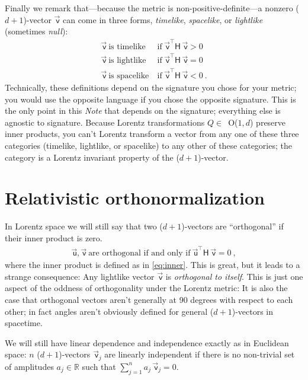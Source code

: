 \documentclass{article}
\newcommand{\metric}{\mathsf{H}}
\newcommand\upvec[1]{\!\vec{\,\mathrm{#1}}}
\newcommand{\Lvec}[1]{\upvec{\mathsf{#1}}} %
\newcommand{\plus}{\!+\!} %
\newcommand{\documentname}{\textsl{Note}}
\begin{document}
Finally we remark that---because the metric is non-positive-definite---a nonzero ($d\plus1$)-vector $\Lvec{v}$ can come in three forms, \emph{timelike}, \emph{spacelike}, or \emph{lightlike} (sometimes \emph{null}):
\begin{align}
    \Lvec{v} ~ \mbox{is timelike}  &~ \mbox{if} ~ \Lvec{v}^\top\metric\,\Lvec{v} > 0 \label{eq:timelike}\\
    \Lvec{v} ~ \mbox{is lightlike} &~ \mbox{if} ~ \Lvec{v}^\top\metric\,\Lvec{v} = 0 \label{eq:lightlike}\\
    \Lvec{v} ~ \mbox{is spacelike} &~ \mbox{if} ~ \Lvec{v}^\top\metric\,\Lvec{v} < 0 ~.\label{eq:spacelike}
\end{align}
Technically, these definitions depend on the signature you chose for your metric; you would use the opposite language if you chose the opposite signature.
This is the only point in this \documentname{} that depends on the signature; everything else is agnostic to signature.
Because Lorentz transformations $Q\in$~O($1,d$) preserve inner products, you can't Lorentz transform a vector from any one of these three categories (timelike, lightlike, or spacelike) to any other of these categories; the category is a Lorentz invariant property of the ($d\plus1$)-vector.

\section{Relativistic orthonormalization}\label{sec:orth}

In Lorentz space we will still say that two ($d\plus1$)-vectors are ``orthogonal'' if their inner product is zero.
\begin{align}
    \Lvec{u},\Lvec{v} ~ \mbox{are orthogonal if and only if} ~ \Lvec{u}^\top\metric\,\Lvec{v}=0 ~,
\end{align}
where the inner product is defined as in \eqref{eq:inner}.
This is great, but it leads to a strange consequence:
Any lightlike vector $\Lvec{v}$ is \emph{orthogonal to itself}.
This is just one aspect of the oddness of orthogonality under the Lorentz metric:
It is also the case that orthogonal vectors aren't generally at 90 degrees with respect to each other; in fact angles aren't obviously defined for general ($d\plus1$)-vectors in spacetime.

We will still have linear dependence and independence exactly as in Euclidean space:
$n$ ($d\plus1$)-vectors $\Lvec{v}_j$ are linearly independent if there is no non-trivial set of amplitudes $a_j\in\mathbb{R}$ such that $\sum_{j=1}^n a_j\,\Lvec{v}_j = 0$.
\end{document}
